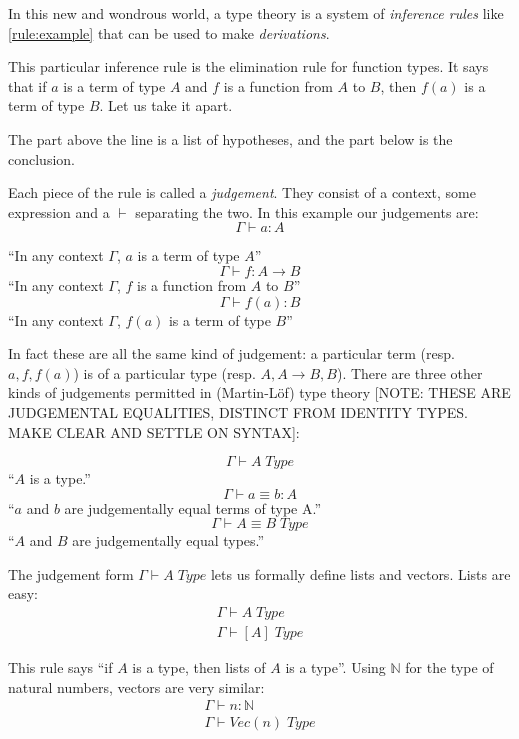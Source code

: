 In this new and wondrous world, a type theory is a system of \emph{inference
  rules} like \ref{rule:example} that can be used to make \emph{derivations}.

This particular inference rule is the elimination rule for function types. It
says that if $a$ is a term of type $A$ and $f$ is a function from $A$ to $B$,
then $f(a)$ is a term of type $B$. Let us take it apart.

The part above the line is a list of hypotheses, and the part below is the conclusion.

Each piece of the rule is called a \emph{judgement}. They consist of a
context, some expression and a $\vdash$ separating the two. In this example our judgements are:
\[\Gamma \vdash a : A\]
\begin{center}
``In any context $\Gamma$, $a$ is a term of type $A$''
\[\Gamma \vdash f : A \rightarrow B\]
``In any context $\Gamma$, $f$ is a function from $A$ to $B$''
\[\Gamma \vdash f(a) : B\]
``In any context $\Gamma$, $f(a)$ is a term of type $B$''
\end{center}

In fact these are all the same kind of judgement: a particular term (resp. $a, f,
f(a)$) is of a particular type (resp. $A, A \rightarrow B, B$). There are three
other kinds of judgements permitted in (Martin-Löf) type theory [NOTE: THESE ARE JUDGEMENTAL
EQUALITIES, DISTINCT FROM IDENTITY TYPES. MAKE CLEAR AND SETTLE ON SYNTAX]:
\begin{center}
  \[\Gamma \vdash A \; Type\]
  ``$A$ is a type.''
  \[\Gamma \vdash a \equiv b : A\]
  ``$a$ and $b$ are judgementally equal terms of type A.''
  \[\Gamma \vdash A \equiv B \; Type\]
  ``$A$ and $B$ are judgementally equal types.''
\end{center}

The judgement form $\Gamma \vdash A \; Type$ lets us formally define lists and
vectors. Lists are easy:
\begin{equation*}
  \begin{array}{c}
    \Gamma \vdash A \; Type \\
    \hline
    \Gamma \vdash [A] \; Type
  \end{array}
  \label{rule:lists}
\end{equation*}

This rule says ``if $A$ is a type, then lists of $A$ is a type''. Using
$\mathbb{N}$ for the type of natural numbers, vectors are very similar:
\begin{equation*}
  \begin{array}{c}
    \Gamma \vdash n : \mathbb{N} \\
    \hline
    \Gamma \vdash Vec (n) \; Type
  \end{array}
  \label{rule:lists}
\end{equation*}

